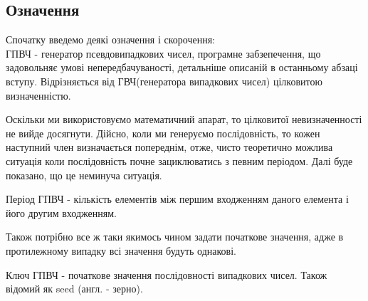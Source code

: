 \documentclass[oneside,final,14pt]{extreport}
\begin{document}
\begin{large}
\section{Означення}\label{s:21}
Спочатку введемо деякі означення і скорочення:\\
ГПВЧ - генератор псевдовипадкових чисел, програмне забзепечення, 
що задовольняє умові непередбачуваності, детальніше описаній в 
останньому абзаці вступу. Відрізняється від ГВЧ(генератора випадкових чисел) 
цілковитою визначенністю.

Оскільки ми використовуємо математичний апарат, то цілковитої 
невизначенності не вийде досягнути. Дійсно, коли ми генеруємо послідовність, то  
кожен наступний член визначається попереднім, отже, чисто теоретично 
можлива ситуація коли послідовність почне зациклюватись з певним періодом. 
Далі буде показано, що це неминуча ситуація.

Період ГПВЧ - кількість елементів між першим входженням даного елемента 
і його другим входженням. 

Також потрібно все ж таки якимось чином задати початкове значення, 
адже в протилежному випадку всі значення будуть однакові.

Ключ ГПВЧ - початкове значення послідовності випадкових чисел. 
Також відомий як seed (англ. - зерно). 


\end{large}
\end{document}
